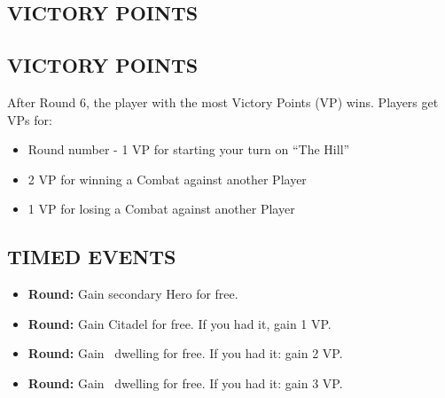 \begin{multicols}{2}
\subsection*{\MakeUppercase{Victory Points}}
\subsection*{\MakeUppercase{Victory Points}}
After Round 6, the player with the most Victory Points (VP) wins.
Players get VPs for:
\begin{itemize}
  \item Round number - 1 VP for starting your turn on ``The Hill''
  \item 2 VP for winning a Combat against another Player
  \item 1 VP for losing a Combat against another Player
\end{itemize}

\subsection*{\MakeUppercase{Timed Events}}

\begin{itemize}
  \item \textbf{ Round:} Gain secondary Hero for free.
  \item \textbf{ Round:} Gain Citadel for free. If you had it, gain 1 VP.
  \item \textbf{ Round:} Gain \silver\ dwelling for free. If you had it: gain 2 VP.
  \item \textbf{ Round:} Gain \golden\ dwelling for free. If you had it: gain 3 VP.
\end{itemize}


\end{multicols}
